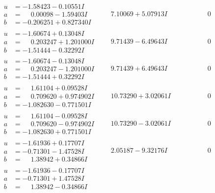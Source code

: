 \documentclass[1p]{elsarticle_modified}
\theoremstyle{definition}
\begin{document}
$$\begin{array}{c|c|c}
\begin{aligned}
u &= -1.58423 - 0.10551 I \\
a &= \phantom{-}0.00098 - 1.59403 I \\
b &= -0.206251 + 0.827340 I\end{aligned}
 & \phantom{-}7.10069 + 5.07913 I & \phantom{-0.000000 } 0 \\ \hline\begin{aligned}
u &= -1.60674 + 0.13048 I \\
a &= \phantom{-}0.203247 + 1.201000 I \\
b &= -1.51444 - 0.32292 I\end{aligned}
 & \phantom{-}9.71439 - 6.49643 I & \phantom{-0.000000 } 0 \\ \hline\begin{aligned}
u &= -1.60674 - 0.13048 I \\
a &= \phantom{-}0.203247 - 1.201000 I \\
b &= -1.51444 + 0.32292 I\end{aligned}
 & \phantom{-}9.71439 + 6.49643 I & \phantom{-0.000000 } 0 \\ \hline\begin{aligned}
u &= \phantom{-}1.61104 + 0.09528 I \\
a &= \phantom{-}0.709620 + 0.974902 I \\
b &= -1.082630 - 0.771501 I\end{aligned}
 & \phantom{-}10.73290 + 3.02061 I & \phantom{-0.000000 } 0 \\ \hline\begin{aligned}
u &= \phantom{-}1.61104 - 0.09528 I \\
a &= \phantom{-}0.709620 - 0.974902 I \\
b &= -1.082630 + 0.771501 I\end{aligned}
 & \phantom{-}10.73290 - 3.02061 I & \phantom{-0.000000 } 0 \\ \hline\begin{aligned}
u &= -1.61936 + 0.17707 I \\
a &= -0.71301 - 1.47528 I \\
b &= \phantom{-}1.38942 + 0.34866 I\end{aligned}
 & \phantom{-}2.05187 - 9.32176 I & \phantom{-0.000000 } 0 \\ \hline\begin{aligned}
u &= -1.61936 - 0.17707 I \\
a &= -0.71301 + 1.47528 I \\
b &= \phantom{-}1.38942 - 0.34866 I\end{aligned}

\end{array}$$
\end{document}
